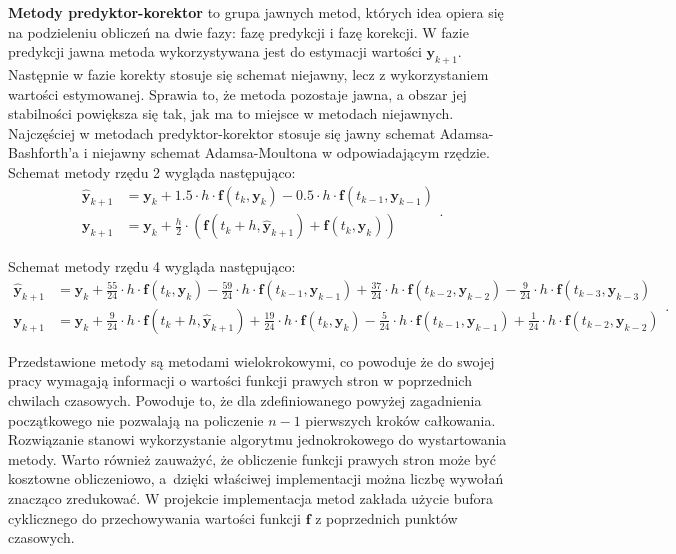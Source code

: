 \textbf{Metody predyktor-korektor} to grupa jawnych metod, których idea opiera się na podzieleniu obliczeń na dwie fazy: fazę predykcji i fazę korekcji. W fazie predykcji jawna metoda wykorzystywana jest do estymacji wartości $\bm{y}_{k+1}$. Następnie w fazie korekty stosuje się schemat niejawny, lecz z wykorzystaniem wartości estymowanej. Sprawia to, że metoda pozostaje jawna, a obszar jej stabilności powiększa się tak, jak ma to miejsce w metodach niejawnych. Najczęściej w metodach predyktor-korektor stosuje się jawny schemat Adamsa-Bashforth'a i niejawny schemat Adamsa-Moultona w odpowiadającym rzędzie. Schemat metody rzędu 2 wygląda następująco:
\[
	\begin{aligned}
	\bm{\hat{y}}_{k+1} & = \bm{y}_{k} + 1.5 \cdot h \cdot  \bm{f} \left( t_{k}, \bm{y}_{k} \right) - 0.5 \cdot h \cdot  \bm{f} \left( t_{k-1}, \bm{y}_{k-1} \right)\\
	\bm{y}_{k+1} & = \bm{y}_{k} + \frac{h}{2} \cdot  \left( \bm{f} \left( t_{k} + h, \bm{\hat{y}}_{k+1} \right) +  \bm{f} \left( t_{k}, \bm{y}_{k} \right) \right)
	\end{aligned}.
\]

Schemat metody rzędu 4 wygląda następująco:
\[
	\begin{aligned}
	\bm{\hat{y}}_{k+1} & = \bm{y}_{k} + \frac{55}{24} \cdot h \cdot  \bm{f} \left( t_{k}, \bm{y}_{k} \right) - \frac{59}{24} \cdot h \cdot  \bm{f} \left( t_{k-1}, \bm{y}_{k-1} \right)  + \frac{37}{24} \cdot h \cdot  \bm{f} \left( t_{k-2}, \bm{y}_{k-2} \right)  - \frac{9}{24} \cdot h \cdot  \bm{f} \left( t_{k-3}, \bm{y}_{k-3} \right) \\
	\bm{y}_{k+1} & = \bm{y}_{k} +   \frac{9}{24} \cdot h \cdot \bm{f} \left( t_{k} + h, \bm{\hat{y}}_{k+1} \right) + \frac{19}{24} \cdot h \cdot  \bm{f} \left( t_{k}, \bm{y}_{k} \right) - \frac{5}{24} \cdot h \cdot  \bm{f} \left( t_{k-1}, \bm{y}_{k-1} \right)  + \frac{1}{24} \cdot h \cdot  \bm{f} \left( t_{k-2}, \bm{y}_{k-2} \right)
	\end{aligned}.
\]

Przedstawione metody są metodami wielokrokowymi, co powoduje że do swojej pracy wymagają informacji o wartości funkcji prawych stron w poprzednich chwilach czasowych. Powoduje to, że dla zdefiniowanego powyżej zagadnienia początkowego nie pozwalają na policzenie $n-1$ pierwszych kroków całkowania. Rozwiązanie stanowi wykorzystanie algorytmu jednokrokowego do wystartowania metody. Warto również zauważyć, że obliczenie funkcji prawych stron może być kosztowne obliczeniowo, a~dzięki właściwej implementacji można liczbę wywołań znacząco zredukować. W projekcie implementacja metod zakłada użycie bufora cyklicznego do przechowywania wartości funkcji $\bm{f}$ z poprzednich punktów czasowych.

